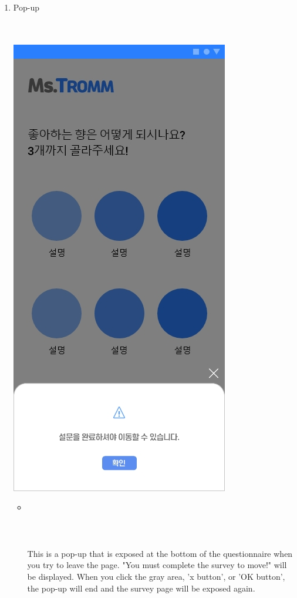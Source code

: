\documentclass[conference]{IEEEtran}
\begin{document}
\begin{enumerate}
\begin{enumerate}
\begin{itemize}
        \end{itemize} 
            \item Pop-up\\ \\ \\
            \centerline{\includegraphics[scale=0.32]{5-4. 설문 팝업.jpg}}
    \begin{itemize}
        \item[] \\ \\ \\ \\ This is a pop-up that is exposed at the bottom of the questionnaire when you try to leave the page. "You must complete the survey to move!" will be displayed. When you click the gray area, 'x button', or 'OK button', the pop-up will end and the survey page will be exposed again.\\ \\ \\ \\ \\ \\

\end{itemize}
\end{enumerate}
\end{enumerate}
\end{document}

